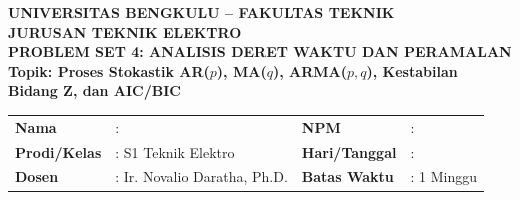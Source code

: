 \documentclass[11pt,a4paper]{article}
\begin{document}
\begin{center}
    {\large \textbf{\color{primaryblue}UNIVERSITAS BENGKULU -- FAKULTAS TEKNIK}}\\[0.1cm]
    {\large \textbf{\color{secondaryblue}JURUSAN TEKNIK ELEKTRO}}\\[0.2cm]
    {\LARGE \textbf{\color{primaryblue}PROBLEM SET 4: ANALISIS DERET WAKTU DAN PERAMALAN}}\\[0.1cm]
    {\normalsize \textbf{Topik: Proses Stokastik AR($p$), MA($q$), ARMA($p,q$), Kestabilan Bidang Z, dan AIC/BIC}}
\end{center}

\vspace{0.1cm}

\begin{tcolorbox}[colback=boxbg,colframe=primaryblue,arc=2mm,title=\textbf{Informasi Tugas \& Identitas Mahasiswa}]
\small
\begin{tabular}{p{2.2cm}p{5.5cm}p{2.2cm}p{5.0cm}}
\textbf{Nama} & : \dotfill & \textbf{NPM} & : \dotfill \\
\textbf{Prodi/Kelas} & : S1 Teknik Elektro & \textbf{Hari/Tanggal} & : \dotfill \\
\textbf{Dosen} & : Ir. Novalio Daratha, Ph.D. & \textbf{Batas Waktu} & : 1 Minggu \\
\end{tabular}
\end{tcolorbox}

\vspace{0.2cm}
\end{document}
